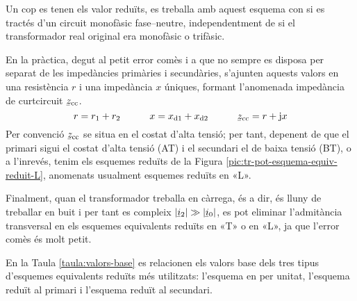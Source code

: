 Un cop es tenen els valor reduïts, es treballa amb aquest esquema con si es tractés d'un circuit monofàsic fase--neutre, independentment de si el transformador real original era monofàsic o trifàsic.

En la pràctica, degut al petit error comès i a que no sempre es disposa per separat de les impedàncies primàries i secundàries,  s'ajunten aquests valors en una resistència $r$ i una  impedància $x$ úniques, formant l'anomenada impedància de curtcircuit $\cmplx{z}\ped{cc}$.
\begin{equation}
    r= r\ped{1}+r\ped{2} \qquad\quad x= x\ped{d1}+x\ped{d2} \qquad\quad \cmplx{z}\ped{cc} = r + \ju x
\end{equation}
Per convenció $\cmplx{z}\ped{cc}$ se situa en el costat d'alta tensió; per tant, depenent de que el primari  sigui el costat d'alta tensió (AT) i el secundari el de baixa tensió (BT), o a l'inrevés, tenim els esquemes reduïts de la Figura \vref{pic:tr-pot-esquema-equiv-reduit-L}, anomenats usualment esquemes reduïts en «L».  
\begin{center}
    
    \label{pic:tr-pot-esquema-equiv-reduit-L}
\end{center}

\vspace{-4mm}
Finalment, quan el transformador treballa en càrrega, és a dir, és lluny de treballar en buit i per tant es compleix $|\cmplx{i}_2| \gg |\cmplx{i}_0|$, es pot eliminar l'admitància transversal en els esquemes equivalents reduïts en «T» o en «L», ja que l'error comès és molt petit.

En la  Taula \vref{taula:valors-base} es relacionen els valors base dels tres tipus d'esquemes equivalents reduïts més utilitzats: l'esquema en per unitat, l'esquema reduït al primari i l'esquema reduït al secundari.

